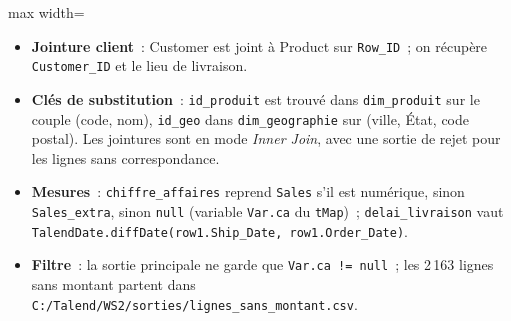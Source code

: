 \begin{center}
\begin{adjustbox}{max width=\linewidth}
\end{adjustbox}
\end{center}

\begin{itemize}
	\item \textbf{Jointure client}~: Customer est joint à Product sur \texttt{Row\_ID}~; on récupère \texttt{Customer\_ID} et le lieu de livraison.
	\item \textbf{Clés de substitution}~: \texttt{id\_produit} est trouvé dans \texttt{dim\_produit} sur le couple (code, nom), \texttt{id\_geo} dans \texttt{dim\_geographie} sur (ville, État, code postal). Les jointures sont en mode \textit{Inner Join}, avec une sortie de rejet pour les lignes sans correspondance.
	\item \textbf{Mesures}~: \texttt{chiffre\_affaires} reprend \texttt{Sales} s'il est numérique, sinon \texttt{Sales\_extra}, sinon \texttt{null} (variable \texttt{Var.ca} du \texttt{tMap})~; \texttt{delai\_livraison} vaut \texttt{TalendDate.diffDate(row1.Ship\_Date, row1.Order\_Date)}.
	\item \textbf{Filtre}~: la sortie principale ne garde que \texttt{Var.ca != null}~; les 2\,163 lignes sans montant partent dans \texttt{C:/Talend/WS2/sorties/lignes\_sans\_montant.csv}.
\end{itemize}

